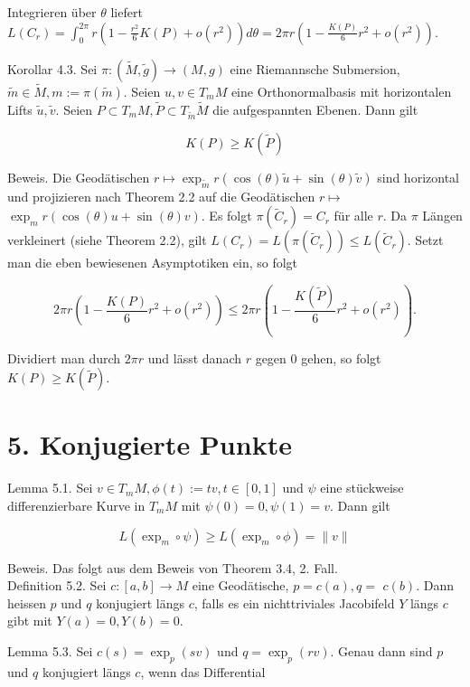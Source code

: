 \documentclass[10pt, letterpaper]{article}
\begin{document}
Integrieren über $\theta$ liefert\\
$L\left(C_{r}\right)=\int_{0}^{2 \pi} r\left(1-\frac{r^{2}}{6} K(P)+o\left(r^{2}\right)\right) d \theta=2 \pi r\left(1-\frac{K(P)}{6} r^{2}+o\left(r^{2}\right)\right)$.

Korollar 4.3. Sei $\pi:(\tilde{M}, \tilde{g}) \rightarrow(M, g)$ eine Riemannsche Submersion, $\tilde{m} \in \tilde{M}, m:=\pi(\tilde{m})$. Seien $u, v \in T_{m} M$ eine Orthonormalbasis mit horizontalen Lifts $\tilde{u}, \tilde{v}$. Seien $P \subset T_{m} M, \tilde{P} \subset T_{\tilde{m}} \tilde{M}$ die aufgespannten Ebenen. Dann gilt

$$
K(P) \geq K(\tilde{P})
$$

Beweis. Die Geodätischen $r \mapsto \exp _{\tilde{m}} r(\cos (\theta) \tilde{u}+\sin (\theta) \tilde{v})$ sind horizontal und projizieren nach Theorem 2.2 auf die Geodätischen $r \mapsto$ $\exp _{m} r(\cos (\theta) u+\sin (\theta) v)$. Es folgt $\pi\left(\tilde{C}_{r}\right)=C_{r}$ für alle $r$. Da $\pi$ Längen verkleinert (siehe Theorem 2.2), gilt $L\left(C_{r}\right)=L\left(\pi\left(\tilde{C}_{r}\right)\right) \leq L\left(\tilde{C}_{r}\right)$. Setzt man die eben bewiesenen Asymptotiken ein, so folgt

$$
2 \pi r\left(1-\frac{K(P)}{6} r^{2}+o\left(r^{2}\right)\right) \leq 2 \pi r\left(1-\frac{K(\tilde{P})}{6} r^{2}+o\left(r^{2}\right)\right) .
$$

Dividiert man durch $2 \pi r$ und lässt danach $r$ gegen 0 gehen, so folgt $K(P) \geq K(\tilde{P})$.

\section*{5. Konjugierte Punkte}
Lemma 5.1. Sei $v \in T_{m} M, \phi(t):=t v, t \in[0,1]$ und $\psi$ eine stückweise differenzierbare Kurve in $T_{m} M$ mit $\psi(0)=0, \psi(1)=v$. Dann gilt

$$
L\left(\exp _{m} \circ \psi\right) \geq L\left(\exp _{m} \circ \phi\right)=\|v\|
$$

Beweis. Das folgt aus dem Beweis von Theorem 3.4, 2. Fall.\\
Definition 5.2. Sei $c:[a, b] \rightarrow M$ eine Geodätische, $p=c(a), q=$ $c(b)$. Dann heissen $p$ und $q$ konjugiert längs $c$, falls es ein nichttriviales Jacobifeld $Y$ längs $c$ gibt mit $Y(a)=0, Y(b)=0$.

Lemma 5.3. Sei $c(s)=\exp _{p}(s v)$ und $q=\exp _{p}(r v)$. Genau dann sind $p$ und $q$ konjugiert längs $c$, wenn das Differential
\end{document}
